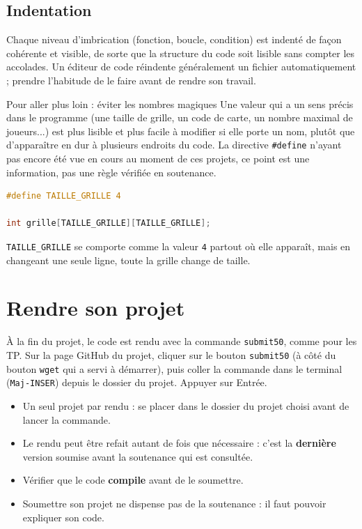\subsection{Indentation}

Chaque niveau d'imbrication (fonction, boucle, condition) est indenté de
façon cohérente et visible, de sorte que la structure du code soit
lisible sans compter les accolades. Un éditeur de code réindente
généralement un fichier automatiquement ; prendre l'habitude de le faire
avant de rendre son travail.

\begin{UPSTIinfor}{Pour aller plus loin : éviter les nombres magiques}
Une valeur qui a un sens précis dans le programme (une taille de grille,
un code de carte, un nombre maximal de joueurs...) est plus lisible et
plus facile à modifier si elle porte un nom, plutôt que d'apparaître en
dur à plusieurs endroits du code. La directive \texttt{\#define} n'ayant
pas encore été vue en cours au moment de ces projets, ce point est une
information, pas une règle vérifiée en soutenance.
\begin{lstlisting}[language=C]
#define TAILLE_GRILLE 4

int grille[TAILLE_GRILLE][TAILLE_GRILLE];
\end{lstlisting}
\texttt{TAILLE\_GRILLE} se comporte comme la valeur \texttt{4} partout où
elle apparaît, mais en changeant une seule ligne, toute la grille change
de taille.
\end{UPSTIinfor}

\section{Rendre son projet}

À la fin du projet, le code est rendu avec la commande \texttt{submit50}, comme pour les TP. Sur la page GitHub du projet, cliquer sur le bouton \texttt{submit50} (à côté du bouton \texttt{wget} qui a servi à démarrer), puis coller la commande dans le terminal (\texttt{Maj-INSER}) depuis le dossier du projet. Appuyer sur Entrée.

\begin{itemize}
  \item Un seul projet par rendu : se placer dans le dossier du projet choisi avant de lancer la commande.
  \item Le rendu peut être refait autant de fois que nécessaire : c'est la \textbf{dernière} version soumise avant la soutenance qui est consultée.
  \item Vérifier que le code \textbf{compile} avant de le soumettre.
  \item Soumettre son projet ne dispense pas de la soutenance : il faut pouvoir expliquer son code.
\end{itemize}
